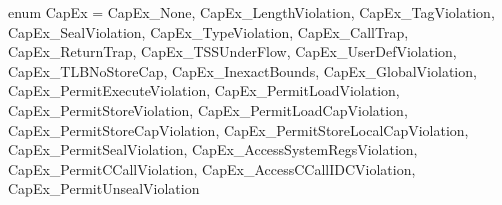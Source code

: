 enum CapEx = {
  CapEx_None, 
  CapEx_LengthViolation,
  CapEx_TagViolation,
  CapEx_SealViolation,
  CapEx_TypeViolation,
  CapEx_CallTrap,
  CapEx_ReturnTrap,
  CapEx_TSSUnderFlow,
  CapEx_UserDefViolation,
  CapEx_TLBNoStoreCap,
  CapEx_InexactBounds,
  CapEx_GlobalViolation,
  CapEx_PermitExecuteViolation,
  CapEx_PermitLoadViolation,
  CapEx_PermitStoreViolation,
  CapEx_PermitLoadCapViolation,
  CapEx_PermitStoreCapViolation,
  CapEx_PermitStoreLocalCapViolation,
  CapEx_PermitSealViolation,
  CapEx_AccessSystemRegsViolation,
  CapEx_PermitCCallViolation,
  CapEx_AccessCCallIDCViolation,
  CapEx_PermitUnsealViolation
}
